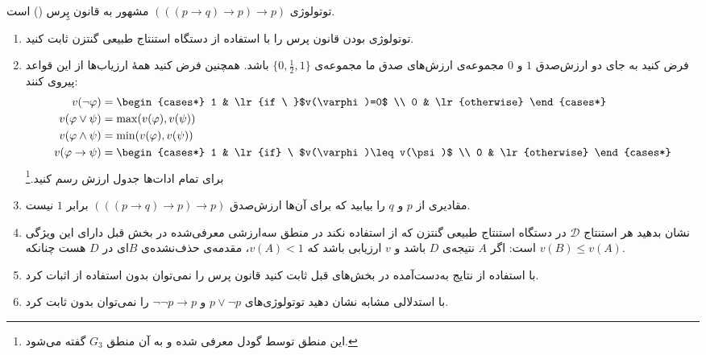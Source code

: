 توتولوژی
$(((p\to q)\to p)\to p)$
مشهور به قانون پِرس
()
است.
\begin{enumerate}[label=(\alph*)]
\item
توتولوژی بودن قانون پرس را با استفاده از دستگاه استنتاج طبیعی گنتزن ثابت کنید.
\item
فرض کنید به جای دو ارزش‌صدق $1$ و $0$ مجموعه‌ی ارزش‌های صدق ما مجموعه‌ی $\{0,\frac{1}{2},1\}$ باشد.
همچنین فرض کنید همهٔ ارزیاب‌ها از این قواعد پیروی کنند:
\begin{align*}
  v(\neg\varphi)&=\begin{cases*}
    1 & \lr{if \ }$v(\varphi)=0$ \\
    0 & \lr{otherwise}
  \end{cases*}\\
  v(\varphi\vee\psi)&=\max(v(\varphi),v(\psi)) \\
  v(\varphi\wedge\psi)&=\min(v(\varphi),v(\psi)) \\
  v(\varphi\to\psi)&=\begin{cases*}
    1 & \lr{if} \ $v(\varphi)\leq v(\psi)$ \\
    0 & \lr{otherwise}
  \end{cases*}
\end{align*}
برای تمام ادات‌ها جدول ارزش رسم کنید.\footnote{
این منطق توسط گودل معرفی شده و به آن منطق
$G_3$
گفته می‌شود.
}
\item
مقادیری از $p$ و $q$ را بیابید که برای آن‌ها ارزش‌صدق $(((p\to q)\to p)\to p)$ برابر $1$ نیست.
\item
نشان بدهید هر استنتاج $\mathcal{D}$
در دستگاه استنتاج طبیعی گنتزن که از
استفاده نکند در منطق سه‌ارزشی معرفی‌شده در بخش قبل دارای این ویژگی است: اگر $A$ نتیجه‌ی $D$ باشد و $v$ ارزیابی باشد که $v(A)<1$، مقدمه‌ی حذف‌نشده‌ی $B$ای در $D$ هست چنانکه $v(B)\leq v(A)$.
\item
با استفاده از نتایج به‌دست‌آمده در بخش‌های قبل ثابت کنید قانون پرس را نمی‌توان بدون استفاده از
اثبات کرد.
\item با استدلالی مشابه نشان دهید توتولوژی‌های
  $p\vee\neg p$
  و
  $\neg\neg p\to p$
  را نمی‌توان بدون
  ثابت کرد.
\end{enumerate}\quad\vspace{-1cm}
